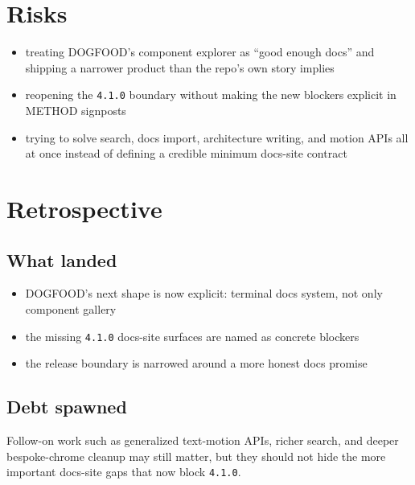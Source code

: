 \section{Risks}\label{record-082-risks}

\begin{itemize}
\tightlist
\item
  treating DOGFOOD's component explorer as ``good enough docs'' and shipping a narrower product than the repo's own story implies
\item
  reopening the \texttt{4\allowbreak{}.\allowbreak{}1\allowbreak{}.\allowbreak{}0} boundary without making the new blockers explicit in METHOD signposts
\item
  trying to solve search, docs import, architecture writing, and motion APIs all at once instead of defining a credible minimum docs-site contract
\end{itemize}

\section{Retrospective}\label{record-082-retrospective}

\subsection{What landed}\label{record-082-what-landed}

\begin{itemize}
\tightlist
\item
  DOGFOOD's next shape is now explicit: terminal docs system, not only component gallery
\item
  the missing \texttt{4\allowbreak{}.\allowbreak{}1\allowbreak{}.\allowbreak{}0} docs-site surfaces are named as concrete blockers
\item
  the release boundary is narrowed around a more honest docs promise
\end{itemize}

\subsection{Debt spawned}\label{record-082-debt-spawned}

Follow-on work such as generalized text-motion APIs, richer search, and deeper bespoke-chrome cleanup may still matter, but they should not hide the more important docs-site gaps that now block \texttt{4\allowbreak{}.\allowbreak{}1\allowbreak{}.\allowbreak{}0}.


